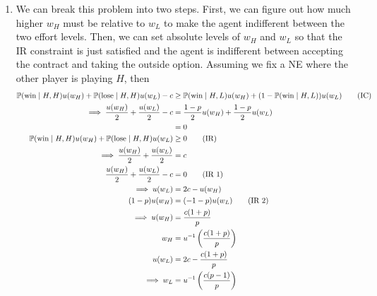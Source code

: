 \begin{enumerate}[label=\alph*)]
\item
  We can break this problem into two steps. First, we can figure out how much higher $w_H$ must be relative to $w_L$ to make the agent indifferent between the two effort levels. Then, we can set absolute levels of $w_H$ and $w_L$ so that the IR constraint is just satisfied and the agent is indifferent between accepting the contract and taking the outside option. Assuming we fix a NE where the other player is playing $H$, then
  \begin{align*}
    \mathbb{P}(\text{win} \mid H, H) u(w_H) + \mathbb{P}(\text{lose} \mid H, H) u(w_L) - c &\ge \mathbb{P}(\text{win} \mid H, L) u(w_H) + (1 - \mathbb{P}(\text{win} \mid H, L)) u(w_L) \tag{IC}\\
    \implies \frac{u(w_H)}{2} + \frac{u(w_L)}{2} - c &= \frac{1 - p}{2} u(w_H) + \frac{1 - p}{2} u(w_L) \\
                                                                           &= 0\\
    \mathbb{P}(\text{win} \mid H, H) u(w_H) + \mathbb{P}(\text{lose} \mid H, H) u (w_L) &\ge 0 \tag{IR}\\
    \implies \frac{u(w_H)}{2} + \frac{u(w_L)}{2} &=c\\
    \frac{u(w_H)}{2} + \frac{u(w_L)}{2} - c &= 0 \tag{IR 1}\\
    \implies u(w_L) &= 2c - u(w_H)\\
    (1 - p) u(w_H) &= (-1 - p) u(w_L) \tag{IR 2}\\
    \implies u(w_H) &= \frac{c(1 + p)}{p}\\
    w_H &= u^{-1} \left(\frac{c(1 + p)}{p}\right)\\
    u(w_L) &= 2c - \frac{c(1 + p)}{p}\\
    \implies w_L &= u^{-1}\left(\frac{c(p-1)}{p}\right)
  \end{align*}

\end{enumerate}
